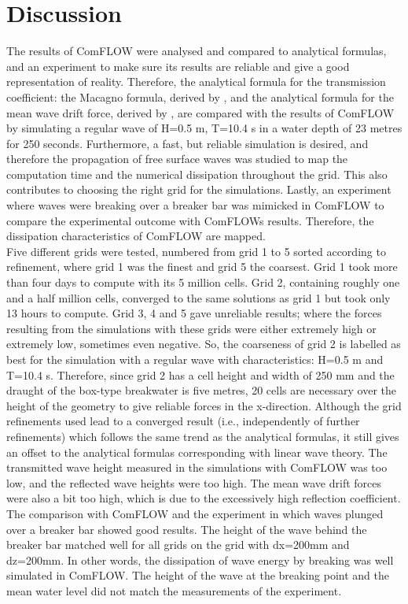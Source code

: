 \section{Discussion}
The results of ComFLOW were analysed and compared to analytical formulas, and an experiment to make sure its results are reliable and give a good representation of reality. Therefore, the analytical formula for the transmission coefficient: the Macagno formula, derived by \parencite{macagno1953fluid}, and the analytical formula for the mean wave drift force, derived by \parencite{longuethiggins1977}, are compared with the results of ComFLOW by simulating a regular wave of H=0.5 m, T=10.4 s in a water depth of 23 metres for 250 seconds. Furthermore, a fast, but reliable simulation is desired, and therefore the propagation of free surface waves was studied to map the computation time and the numerical dissipation throughout the grid. This also contributes to choosing the right grid for the simulations. Lastly, an experiment where waves were breaking over a breaker bar was mimicked in ComFLOW to compare the experimental outcome with ComFLOWs results. Therefore, the dissipation characteristics of ComFLOW are mapped.
\\
Five different grids were tested, numbered from grid 1 to 5 sorted according to refinement, where grid 1 was the finest and grid 5 the coarsest. Grid 1 took more than four days to compute with its 5 million cells. Grid 2, containing roughly one and a half million cells, converged to the same solutions as grid 1 but took only 13 hours to compute. Grid 3, 4 and 5 gave unreliable results; where the forces resulting from the simulations with these grids were either extremely high or extremely low, sometimes even negative. So, the coarseness of grid 2 is labelled as best for the simulation with a regular wave with characteristics: H=0.5 m and T=10.4 s. Therefore, since grid 2 has a cell height and width of 250 mm and the draught of the box-type breakwater is five metres, 20 cells are necessary over the height of the geometry to give reliable forces in the x-direction. Although the grid refinements used lead to a converged result (i.e., independently of further refinements) which follows the same trend as the analytical formulas, it still gives an offset to the analytical formulas corresponding with linear wave theory. The transmitted wave height measured in the simulations with ComFLOW was too low, and the reflected wave heights were too high. The mean wave drift forces were also a bit too high, which is due to the excessively high reflection coefficient. \\
The comparison with ComFLOW and the experiment in which waves plunged over a breaker bar showed good results. The height of the wave behind the breaker bar matched well for all grids on the grid with dx=200mm and dz=200mm. In other words, the dissipation of wave energy by breaking was well simulated in ComFLOW. The height of the wave at the breaking point and the mean water level did not match the measurements of the experiment.

